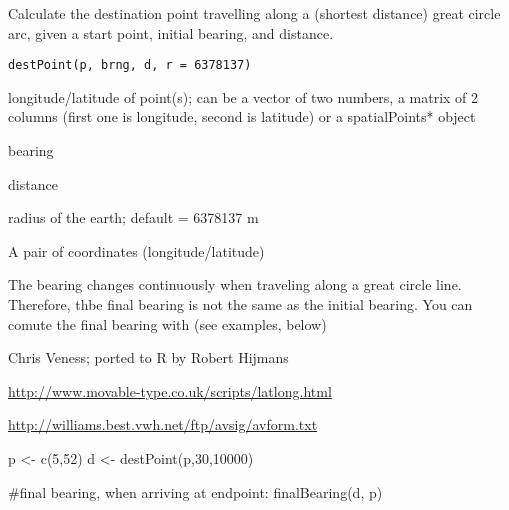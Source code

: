 \begin{Description}\relax
Calculate the destination point travelling along a (shortest distance) great circle arc, given a start point, initial bearing, and distance.
\end{Description}
\begin{Usage}
\begin{verbatim}
destPoint(p, brng, d, r = 6378137)
\end{verbatim}
\end{Usage}
\begin{Arguments}
\begin{ldescription}
\item[\code{p}] longitude/latitude of point(s); can be a vector of two numbers, a matrix of 2 columns (first one is longitude, second is latitude) or a spatialPoints* object
\item[\code{brng}] bearing
\item[\code{d}] distance
\item[\code{r}] radius of the earth; default = 6378137 m
\end{ldescription}
\end{Arguments}
\begin{Value}
A pair of coordinates (longitude/latitude)
\end{Value}
\begin{Note}\relax
The bearing changes continuously when traveling along a great circle line. Therefore, thbe final bearing is not the same as the initial bearing. You can comute the final bearing with  (see examples, below)
\end{Note}
\begin{Author}\relax
Chris Veness; ported to R by Robert Hijmans
\end{Author}
\begin{References}\relax
\url{http://www.movable-type.co.uk/scripts/latlong.html}

\url{http://williams.best.vwh.net/ftp/avsig/avform.txt}
\end{References}
\begin{Examples}
\begin{ExampleCode}
p <- c(5,52)
d <- destPoint(p,30,10000)

#final bearing, when arriving at endpoint: 
finalBearing(d, p)

\end{ExampleCode}
\end{Examples}


